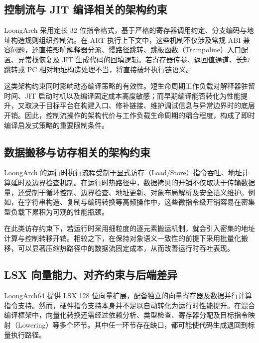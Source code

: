 \subsection{控制流与 JIT 编译相关的架构约束}

LoongArch 采用定长 32 位指令格式，基于严格的寄存器调用约定、分支编码与地址构造规则组织控制流\citep{LoongArchISA2023, LoongArchELFABI2025}。在 ART 执行上下文中，这些机制不仅涉及常规 ABI 兼容问题，还直接影响解释器分派、慢路径跳转、跳板函数（Trampoline）入口配置、异常栈恢复及 JIT 生成代码的回填逻辑。若寄存器传参、返回值通道、长短跳转或 PC 相对地址构造处理不当，将直接破坏执行链语义。

这类架构约束同时影响动态编译策略的有效性。短生命周期工作负载对解释器驻留时间、JIT 启动时机以及编译固定成本高度敏感；而早期编译能否转化为性能提升，又取决于目标平台在构建入口、修补链接、维护调试信息与异常边界时的底层开销。因此，控制流操作的架构代价与工作负载生命周期的耦合程度，构成了即时编译启发式策略的重要限制条件。

\subsection{数据搬移与访存相关的架构约束}

LoongArch 的运行时执行流程受制于显式访存（Load/Store）指令吞吐、地址计算延时及边界检查机制\citep{LoongArchISA2023, LoongArchISAv2}。在运行时热路径中，数据拷贝的开销不仅取决于传输数据量，还受制于循环控制、边界检查、地址更新、对象布局解析及安全语义维护。例如，在字符串构造、复制与编码转换等高频操作中，这些微指令级开销容易在密集型负载下累积为可观的性能瓶颈\citep{Haubl2008OptimizedStrings, Haubl2010CompactStrings}。

在此类访存约束下，若运行时采用细粒度的逐元素搬运机制，就会引入密集的地址计算与控制转移开销。相较之下，在保持对象语义一致性的前提下采用批量化搬移，可以显著压缩热路径中的数据流固定成本，从而改善运行时吞吐表现。

\subsection{LSX 向量能力、对齐约束与后端差异}

LoongArch64 提供 LSX 128 位向量扩展，配备独立的向量寄存器及数据并行计算指令支持\citep{LoongArchISA2023, LoongArchISAv2}。然而，硬件指令支持本身并不足以自动转化为运行时性能提升。在混合编译框架中，向量化转换还需经过依赖分析、类型检查、寄存器分配及目标指令映射（Lowering）等多个环节\citep{Nie2010VectorizationJava}。其中任一环节存在缺口，都可能使代码生成退回到标量执行路径。

